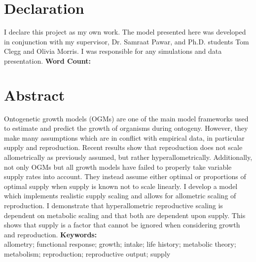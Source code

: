 \documentclass[a4paper, 11pt, hidelinks]{article} %
\newcommand\wordcount{} %
\begin{document}
	
	

	\section*{Declaration}
	I declare this project as my own work.  The model presented here was developed in conjunction with my supervisor, Dr. Samraat Pawar, and Ph.D. students Tom Clegg and Olivia Morris.  I was responsible for any simulations and data presentation.\newline
	\textbf{Word Count: \wordcount}

	\newpage
	
	\section*{Abstract}
	\linenumbers
	Ontogenetic growth models (OGMs) are one of the main model frameworks used to estimate and predict the growth of organisms during ontogeny.  However, they make many assumptions which are in conflict with empirical data, in particular supply and reproduction.  Recent results show that reproduction does not scale allometrically as previously assumed, but rather hyperallometrically.  Additionally, not only OGMs but all growth models have failed to properly take variable supply rates into account.  They instead assume either optimal or proportions of optimal supply when supply is known not to scale linearly.  
	I develop a model which implements realistic supply scaling and allows for allometric scaling of reproduction.  I demonstrate that hyperallometric reproductive scaling is dependent on metabolic scaling and that both are dependent upon supply.  This shows that supply is a factor that cannot be ignored when considering growth and reproduction.
%	
	\vspace*{0.5 cm}
	\newline
	\textbf{Keywords:}\\
	allometry; functional response; growth; intake; life history; metabolic theory; metabolism; reproduction; reproductive output; supply
	
\end{document}
